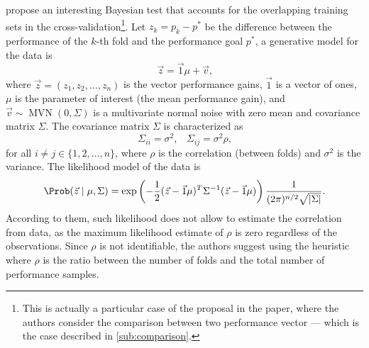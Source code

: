 \textcite{Benavoli2017} propose an interesting Bayesian test that accounts for the
overlapping training sets in the cross-validation\footnote{%
This is actually a particular case of the proposal in the paper, where the authors
consider the comparison between two performance vector --- which is the case described in
\cref{sub:comparison}.}.
Let $z_k = p_k - p^{*}$ be the
difference between the performance of the $k$-th fold and the performance goal $p^{*}$,
a generative model for the data is
\begin{equation*}
  \vec{z} = \vec{1}\mu + \vec{v}\text{,}
\end{equation*}
where $\vec{z} = (z_1, z_2, \ldots, z_n)$ is the vector performance gains, $\vec{1}$ is a
vector of ones, $\mu$ is the parameter of interest (the mean performance gain), and
$\vec{v} \sim \operatorname{MVN}(0, \Sigma)$ is a multivariate normal noise with zero mean
and covariance matrix $\Sigma$.  The covariance matrix $\Sigma$ is characterized as
\begin{equation*}
  \Sigma_{ii} = \sigma^2\text{,}\quad
  \Sigma_{ij} = \sigma^2\rho\text{,}
\end{equation*}
for all $i \neq j \in \{1, 2, \ldots, n\}$, where $\rho$ is the correlation (between folds)
and $\sigma^2$ is the variance.  The likelihood model of the data is
\begin{equation*}
  \Prob(\vec{z} \mid \mu, \Sigma) =
    \exp\left(-\frac{1}{2}(\vec{z} - \vec{1}\mu)^T \Sigma^{-1} (\vec{z} - \vec{1}\mu)\right)
    \frac{1}{(2\pi)^{n/2} \sqrt{\lvert \Sigma \rvert}}\text{.}
\end{equation*}
According to them, such likelihood does not allow to estimate the correlation from data,
as the maximum likelihood estimate of $\rho$ is zero regardless of the observations.
Since $\rho$ is not identifiable, the authors suggest using the heuristic where $\rho$ is
the ratio between the number of folds and the total number of performance samples.


